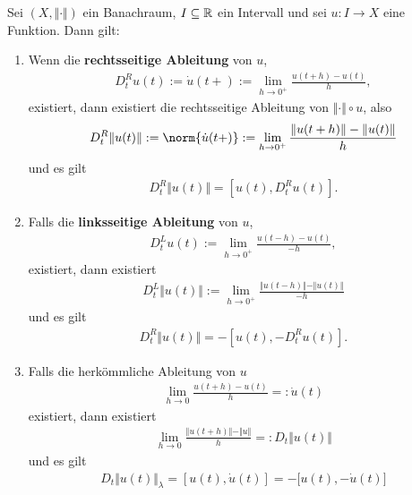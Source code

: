 \begin{lemma}
	Sei $(X,\Vert\cdot\Vert)$ ein Banachraum, $I\subseteq\mathbb{R}$ ein Intervall und sei $u:I\to X$ eine Funktion. 
	Dann gilt:
	\begin{enumerate}[label=(\alph*)]
		\item Wenn die \textbf{rechtsseitige Ableitung} von $u$, 
		\begin{align*}
			D_t^R u(t):=\dot{u}(t+):=\lim\limits_{h\to 0^+}\frac{u(t+h)-u(t)}{h},
		\end{align*}
		existiert, dann existiert die rechtsseitige Ableitung von $\Vert\cdot\Vert\circ u$, also
		\begin{align*}
			D_t^R \Vert u(t)\Vert:=\norm{\dot{u}(t+)}:=\lim\limits_{h\to 0^+}\frac{\Vert u(t+h)\Vert-\Vert u(t)\Vert}{h}
		\end{align*}
		und es gilt
		\begin{align*}
			D_t^R\Vert u(t)\Vert=\left[u(t),D_t^R u(t)\right].
		\end{align*}
		\item Falls die \textbf{linksseitige Ableitung} von $u$,
		\begin{align*}
			D_t^L u(t):=\lim\limits_{h\to 0^+}\frac{u(t-h)-u(t)}{-h},
		\end{align*}
		existiert, dann existiert
		\begin{align*}
			D_t^L \Vert u(t)\Vert:=\lim\limits_{h\to 0^+}\frac{\Vert u(t-h)\Vert-\Vert u(t)\Vert}{-h}
		\end{align*}
		und es gilt
		\begin{align*}
			D_t^R\Vert u(t)\Vert=-\left[u(t),-D_t^R u(t)\right].
		\end{align*}
		\item Falls die herkömmliche Ableitung von $u$
		\begin{align*}
			\lim\limits_{h\to0}\frac{u(t+h)-u(t)}{h}=:\dot{u}(t)
		\end{align*}
		existiert, dann existiert
		\begin{align*}
			\lim\limits_{h\to0}\frac{\Vert u(t+h)\Vert-\Vert u\Vert}{h}=:D_t\Vert u(t)\Vert
		\end{align*}
		und es gilt
		\begin{align*}
			D_t\Vert u(t)\Vert_\lambda=\left[ u(t),\dot{u}(t)\right]=-\big[u(t),-\dot{u}(t)\big]
		\end{align*}
	\end{enumerate}
\end{lemma}

